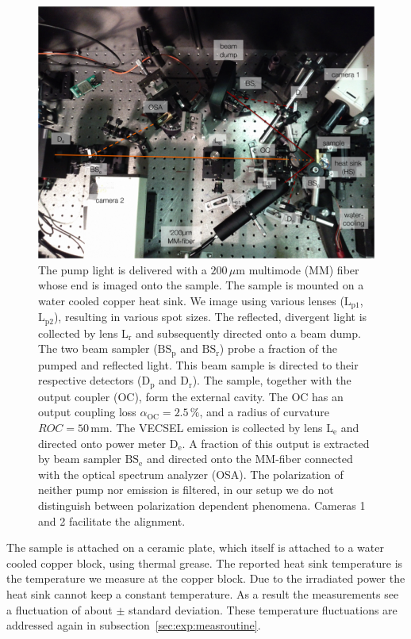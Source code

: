 \begin{figure}
\centering
\includegraphics[width=14.5cm]{img/setup_photo.png}
\caption{The pump light is delivered
with a $200\,\mu\mathrm{m}$ multimode (MM) fiber
whose end is imaged onto the sample.
The sample is
mounted on a water cooled copper heat sink.
We image
using various lenses
($\mathrm{L}_\mathrm{p1}$,$\mathrm{L}_\mathrm{p2}$),
resulting in various spot sizes.
The reflected, divergent light
is collected by lens $\mathrm{L}_\mathrm{r}$
and subsequently directed onto a beam dump.
The two beam sampler
($\mathrm{BS}_\mathrm{p}$ and $\mathrm{BS}_\mathrm{r}$)
probe a fraction of the pumped
and reflected light.
This beam sample is directed
to their respective detectors
($\mathrm{D}_\mathrm{p}$ and $\mathrm{D}_\mathrm{r}$).
The sample,
together with the output coupler (OC),
form the external cavity.
The OC has an output coupling loss
$\alpha_\mathrm{OC}=2.5\,\%$,
and a radius of curvature
$ROC=50\,\mathrm{mm}$.
The VECSEL emission
is collected by lens $\mathrm{L}_\mathrm{e}$
and directed onto power meter $\mathrm{D}_\mathrm{e}$.
A fraction of this output
is extracted by beam sampler $\mathrm{BS}_\mathrm{e}$
and directed onto the MM-fiber
connected with the optical spectrum analyzer (OSA).
The polarization
of neither
pump nor emission
is filtered,
in our setup
we do not distinguish
between polarization dependent phenomena.
Cameras 1 and 2 facilitate the alignment.}
\label{img:setup_photo}
\end{figure}

The sample is attached on a ceramic plate,
which itself is attached
to a water cooled copper block,
using thermal grease.
The reported heat sink temperature
is the temperature we measure
at the copper block.
Due to the irradiated power
the heat sink cannot keep a constant temperature.
As a result the measurements
see a fluctuation of about
$\pm$ standard deviation.
These temperature fluctuations are addressed
again in subsection~\ref{sec:exp:measroutine}.

